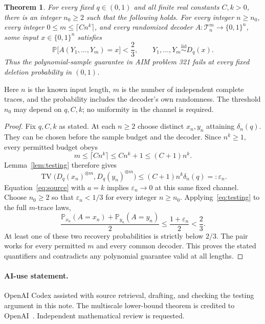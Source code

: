 \documentclass[11pt]{article}
\newtheorem{theorem}{Theorem}
\newcommand{\TV}{\operatorname{TV}}
\newcommand{\Prob}{\mathbb P}
\begin{document}
\begin{theorem}\label{thm:negative}
For every fixed $q\in(0,1)$ and all finite real constants $C,k>0$, there is
an integer $n_0\ge2$ such that the following holds. For every integer
$n\ge n_0$, every integer $0\le m\le\lceil Cn^k\rceil$, and every randomized
decoder $A:\mathcal T_n^m\to\{0,1\}^n$, some input $x\in\{0,1\}^n$ satisfies
\[
 \Prob\bigl[A(Y_1,\ldots,Y_m)=x\bigr]<\frac23,
 \qquad Y_1,\ldots,Y_m\overset{\mathrm{iid}}{\sim}D_q(x).
\]
Thus the polynomial-sample guarantee in AIM problem 321 fails at every fixed
deletion probability in $(0,1)$.
\end{theorem}

Here $n$ is the known input length, $m$ is the number of independent complete
traces, and the probability includes the decoder's own randomness. The
threshold $n_0$ may depend on $q,C,k$; no uniformity in the channel is required.

\begin{proof}
Fix $q,C,k$ as stated. At each $n\ge2$ choose distinct $x_n,y_n$ attaining
$\delta_n(q)$. They can be chosen before the sample budget and the decoder.
Since $n^k\ge1$, every permitted budget obeys
\[
 m\le\lceil Cn^k\rceil\le Cn^k+1\le(C+1)n^k.
\]
Lemma~\ref{lem:testing} therefore gives
\[
 \TV\bigl(D_q(x_n)^{\otimes m},D_q(y_n)^{\otimes m}\bigr)
 \le (C+1)n^k\delta_n(q)=:\varepsilon_n.
\]
Equation~\eqref{eq:source} with $a=k$ implies $\varepsilon_n\to0$ at this
same fixed channel. Choose $n_0\ge2$ so that $\varepsilon_n<1/3$ for every
integer $n\ge n_0$. Applying~\eqref{eq:testing} to the full $m$-trace laws,
\[
 \frac{\Prob_{x_n}(A=x_n)+\Prob_{y_n}(A=y_n)}2
 \le\frac{1+\varepsilon_n}2<\frac23.
\]
At least one of these two recovery probabilities is strictly below $2/3$.
The pair works for every permitted $m$ and every common decoder. This proves
the stated quantifiers and contradicts any polynomial guarantee valid at all
lengths.
\end{proof}

\paragraph{AI-use statement.}
OpenAI Codex assisted with source retrieval, drafting, and checking the testing
argument in this note. The multiscale lower-bound theorem is credited to
OpenAI~\cite{OpenAI2026}. Independent mathematical review is requested.
\end{document}

